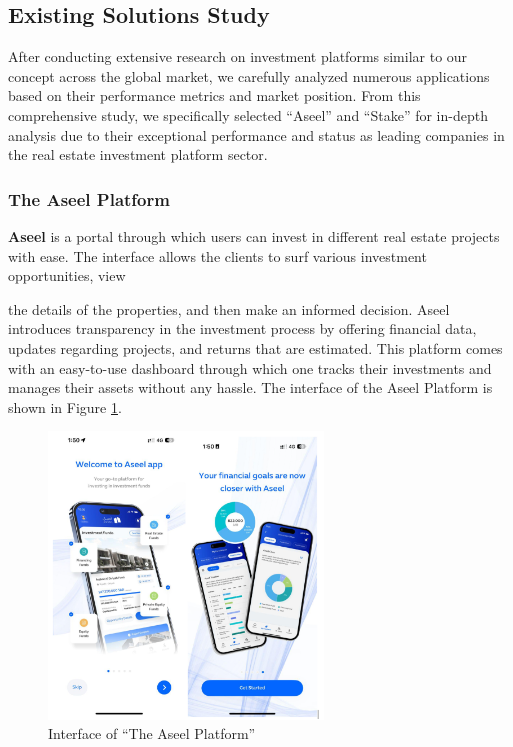 \subsection{Existing Solutions Study}

After conducting extensive research on investment platforms similar to our concept across the global market, we carefully analyzed numerous applications based on their performance metrics and market position. From this comprehensive study, we specifically selected ``Aseel'' \cite{AssilEyeInstitute} and ``Stake'' \cite{StakeWebsite} for in-depth analysis \cite{G2CompetitiveAnalysis2024, AsanaCompetitiveAnalysis2024} due to their exceptional performance and status as leading companies in the real estate investment platform sector.

\subsubsection{The Aseel Platform}

\textbf{\textcolor{primary}{Aseel}} \cite{AssilEyeInstitute} is a portal through which users can invest in different real estate projects with ease. The interface allows the clients to surf various investment opportunities, view 

\newpage

the details of the properties, and then make an informed decision. Aseel introduces transparency in the investment process by offering financial data, updates regarding projects, and returns that are estimated. This platform comes with an easy-to-use dashboard through which one tracks their investments and manages their assets without any hassle. The interface of the Aseel Platform is shown in Figure \ref{fig:aseel-platform}.


\begin{figure}[htbp]
    \centering
    \includegraphics[width=0.65\textwidth]{images/Interface-of-the Aseel Platform.png}
    \caption{Interface of ``The Aseel Platform''}
    \label{fig:aseel-platform}
\end{figure}

